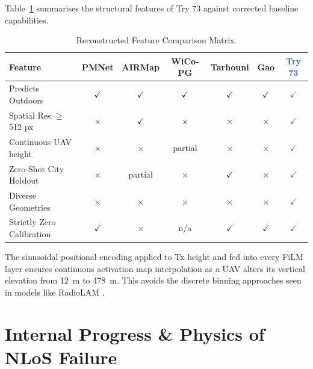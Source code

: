 \documentclass[11pt,a4paper]{article}
\newcommand{\ours}[1]{\textcolor{highlight}{\textbf{#1}}}
\newcommand{\yes}{$\checkmark$}
\newcommand{\no}{$\times$}
\begin{document}
Table~\ref{tab:novelty} summarises the structural features of Try 73 against corrected baseline capabilities. 

\begin{table}[h!]
\centering
\caption{Reconstructed Feature Comparison Matrix.}
\label{tab:novelty}
\small
\begin{tabular}{lcccccc}
\toprule
\textbf{Feature} & \textbf{PMNet} & \textbf{AIRMap} & \textbf{WiCo-PG}
    & \textbf{Tarhouni} & \textbf{Gao} & \ours{\textbf{Try 73}} \\
\midrule
Predicts Outdoors & \yes & \yes & \yes & \yes & \yes & \ours{\yes} \\
Spatial Res $\ge$ 512 px & \no & \yes & \no & \no & \no & \ours{\yes} \\
Continuous UAV height & \no & \no & partial & \no & \no & \ours{\yes} \\
Zero-Shot City Holdout & \no & partial & \no & \yes & \no & \ours{\yes} \\
Diverse Geometries & \no & \no & \no & \no & \no & \ours{\yes} \\
Strictly Zero Calibration & \yes & \no & n/a & \yes & \yes & \ours{\yes} \\
\bottomrule
\end{tabular}
\end{table}

The sinusoidal positional encoding applied to Tx height and fed into every FiLM layer ensures continuous activation map interpolation as a UAV alters its vertical elevation from 12~m to 478~m. This avoids the discrete binning approaches seen in models like RadioLAM \cite{radiolam2025}.

\section{Internal Progress \& Physics of NLoS Failure}
\label{sec:progress}
\end{document}
